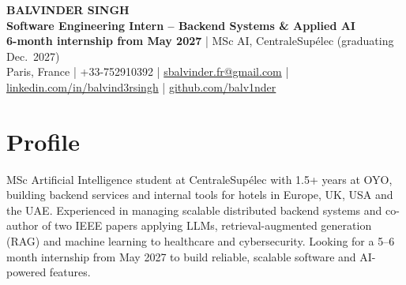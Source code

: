\documentclass[10pt,a4paper]{article}
\begin{document}
\begin{center}
{\LARGE\bfseries BALVINDER SINGH}\\[3pt]
{\large\color{accent}\textbf{Software Engineering Intern -- Backend Systems \& Applied AI}}\\[3pt]
\colorbox{accent!10}{\small\textbf{6-month internship from May 2027} \;|\; MSc AI, CentraleSup\'elec (graduating Dec.\ 2027)}\\[3pt]
\small Paris, France \;|\; +33-752910392 \;|\; \href{mailto:sbalvinder.fr@gmail.com}{sbalvinder.fr@gmail.com} \;|\; \href{https://linkedin.com/in/balvind3rsingh}{linkedin.com/in/balvind3rsingh} \;|\; \href{https://github.com/balv1nder}{github.com/balv1nder}
\end{center}

\section{Profile}
MSc Artificial Intelligence student at CentraleSupélec with 1.5+ years at OYO, building backend services and internal tools for hotels in Europe, UK, USA and the UAE. Experienced in managing scalable distributed backend systems and co-author of two IEEE papers applying LLMs, retrieval-augmented generation (RAG) and machine learning to healthcare and cybersecurity. Looking for
a 5–6 month internship from May 2027 to build reliable, scalable software and AI-powered features.
\end{document}
